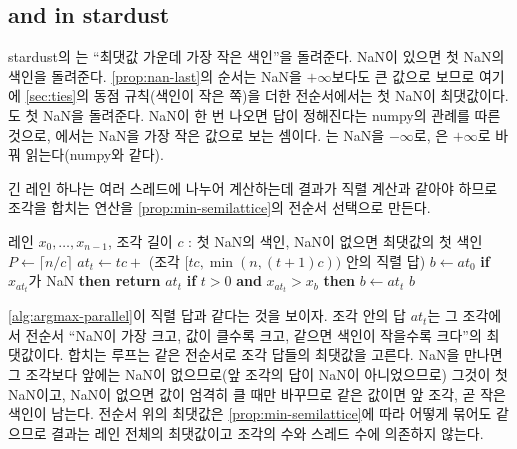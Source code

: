 \subsection{\texorpdfstring{ and }{argmin and argmax} in stardust}

stardust의 는 ``최댓값 가운데 가장 작은 색인''을 돌려준다. NaN이 있으면 첫 NaN의 색인을 돌려준다. \cref{prop:nan-last}의 순서는 NaN을 $+\infty$보다도 큰 값으로 보므로 여기에 \cref{sec:ties}의 동점 규칙(색인이 작은 쪽)을 더한 전순서에서는 첫 NaN이 최댓값이다. 도 첫 NaN을 돌려준다. NaN이 한 번 나오면 답이 정해진다는 numpy의 관례를 따른 것으로, 에서는 NaN을 가장 작은 값으로 보는 셈이다. 는 NaN을 $-\infty$로, 은 $+\infty$로 바꿔 읽는다(numpy와 같다).

긴 레인 하나는 여러 스레드에 나누어 계산하는데 결과가 직렬 계산과 같아야 하므로 조각을 합치는 연산을 \cref{prop:min-semilattice}의 전순서 선택으로 만든다.

\begin{algorithm}[htbp]
\begin{algorithmic}[1]
\Require 레인 $x_0,\dots,x_{n-1}$, 조각 길이 $c$
\Ensure {}: 첫 NaN의 색인, NaN이 없으면 최댓값의 첫 색인
\State $P\gets\lceil n/c\rceil$
  \State $\mathit{at}_t\gets tc+$ (조각 $[tc,\min(n,(t+1)c))$ 안의 직렬 답)
\EndFor
\State $b\gets\mathit{at}_0$
 
  \State \textbf{if} $x_{\mathit{at}_t}$가 NaN \textbf{then return} $\mathit{at}_t$ 
  \State \textbf{if} $t>0$ \textbf{and} $x_{\mathit{at}_t}>x_b$ \textbf{then} $b\gets\mathit{at}_t$ 
\EndFor
\State \Return $b$
\end{algorithmic}
\caption{조각으로 나눈 결정적인 argmax (stardust )}
\label{alg:argmax-parallel}
\end{algorithm}

\cref{alg:argmax-parallel}이 직렬 답과 같다는 것을 보이자. 조각 안의 답 $\mathit{at}_t$는 그 조각에서 전순서 ``NaN이 가장 크고, 값이 클수록 크고, 같으면 색인이 작을수록 크다''의 최댓값이다. 합치는 루프는 같은 전순서로 조각 답들의 최댓값을 고른다. NaN을 만나면 그 조각보다 앞에는 NaN이 없으므로(앞 조각의 답이 NaN이 아니었으므로) 그것이 첫 NaN이고, NaN이 없으면 값이 엄격히 클 때만 바꾸므로 같은 값이면 앞 조각, 곧 작은 색인이 남는다. 전순서 위의 최댓값은 \cref{prop:min-semilattice}에 따라 어떻게 묶어도 같으므로 결과는 레인 전체의 최댓값이고 조각의 수와 스레드 수에 의존하지 않는다.

